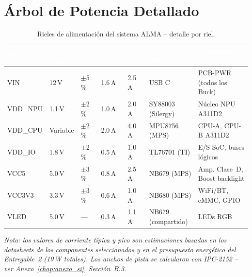 \chapter{Árbol de Potencia Detallado}
\label{chap:anexo_potencia}

\begin{table}[H]
  \centering
  \caption{Rieles de alimentación del sistema ALMA -- detalle por riel.}
  \label{tab:potencia_detalle}
  \begin{tabularx}{\textwidth}{L{2cm} C{1.5cm} C{1.5cm} C{1.8cm} C{1.8cm} L{2.5cm} L{2.5cm}}
    \toprule
    \textcolor{white}{\textbf{Riel}} &
    \textcolor{white}{\textbf{V nom.}} &
    \textcolor{white}{\textbf{Tol.}} &
    \textcolor{white}{\textbf{I típica}} &
    \textcolor{white}{\textbf{I pico}} &
    \textcolor{white}{\textbf{Generado por}} &
    \textcolor{white}{\textbf{Consumido por}} \\
    \midrule
    VIN      & 12\,V   & $\pm$5\,\%  & 1.6\,A    & 2.5\,A    & USB C & PCB-PWR (todos los Buck) \\
    VDD\_NPU & 1.1\,V  & $\pm$2\,\%  & 1.0\,A    & 2.0\,A    & SY88003 (Silergy) & Núcleo NPU A311D2 \\
    VDD\_CPU & Variable & $\pm$2\,\% & 2.0\,A    & 4.0\,A    & MPU8756 (MPS)     & CPU-A, CPU-B A311D2 \\
    VDD\_IO  & 1.8\,V  & $\pm$2\,\%  & 0.5\,A    & 1.0\,A    & TL76701 (TI)      & E/S SoC, buses lógicos \\
    VCC5     & 5.0\,V  & $\pm$3\,\%  & 0.8\,A    & 2.5\,A    & NB679 (MPS)       & Amp. Clase~D, Boost backlight \\
    VCC3V3   & 3.3\,V  & $\pm$3\,\%  & 0.6\,A    & 1.0\,A    & NB680 (MPS)       & WiFi/BT, eMMC, GPIO \\
    VLED     & 5.0\,V  & ---         & 0.3\,A    & 1.1\,A    & NB679 (compartido) & LEDs RGB \\
    \bottomrule
  \end{tabularx}
\end{table}

\textit{Nota: los valores de corriente típica y pico son estimaciones basadas en
los datasheets de los componentes seleccionados y en el presupuesto energético del
Entregable~2 (19\,W totales). Los anchos de pista se calcularon con IPC-2152
\cite{ipc2152} -- ver Anexo~\ref{chap:anexo_si}, Sección~B.3.}

